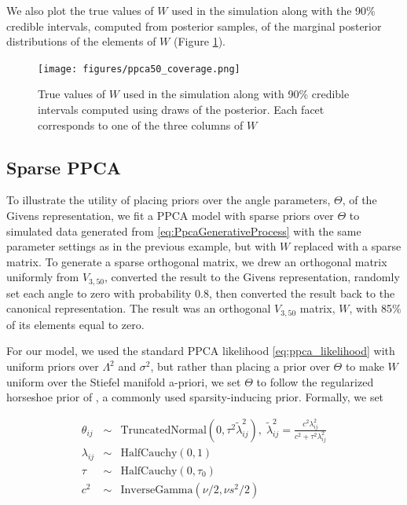 \documentclass[ba]{imsart}
\numberwithin{equation}{section}
\theoremstyle{plain}
\begin{document}
\noindent We also plot the true values of $W$ used in the simulation along with the 90\% credible intervals, computed from posterior samples, of the marginal posterior distributions of the elements of $W$ (Figure \ref{fig:ppca50_coverage}). 

\begin{figure}[h]
\centering
\vspace{.1in}
\texttt{[image: figures/ppca50\_coverage.png]}
\vspace{.05in}
\caption{True values of $W$ used in the simulation along with 90\% credible intervals computed using draws of the posterior. Each facet corresponds to one of the three columns of $W$}
\label{fig:ppca50_coverage}
\end{figure}


\subsection{Sparse PPCA}
To illustrate the utility of placing priors over the angle parameters, $\Theta$, of the Givens representation, we fit a PPCA model with sparse priors over $\Theta$ to simulated data generated from \ref{eq:PpcaGenerativeProcess} with the same parameter settings as in the previous example, but with $W$ replaced with a sparse matrix. To generate a sparse orthogonal matrix, we drew an orthogonal matrix uniformly from $V_{3,50}$, converted the result to the Givens representation, randomly set each angle to zero with probability 0.8, then converted the result back to the canonical representation. The result was an orthogonal $V_{3,50}$ matrix, $W$, with 85\% of its elements equal to zero.

\noindent For our model, we used the standard PPCA likelihood \ref{eq:ppca_likelihood} with uniform priors over $\Lambda^2$ and $\sigma^2$, but rather than placing a prior over $\Theta$ to make $W$ uniform over the Stiefel manifold a-priori, we set $\Theta$ to follow the regularized horseshoe prior of \cite{piironen2017sparsity}, a commonly used sparsity-inducing prior. Formally, we set

\begin{eqnarray}
\theta_{ij} &\sim& \mathrm{TruncatedNormal}(0, \tau^2 \tilde{\lambda}_{ij}^2),\; \tilde{\lambda}_{ij}^2 = \frac{c^2 \lambda_{ij}^2}{c^2 + \tau^2 \lambda_{ij}^2}\\
\lambda_{ij} &\sim& \mathrm{Half Cauchy}(0,1)\nonumber \\
\tau &\sim& \mathrm{Half Cauchy}(0,\tau_0)\nonumber \\
c^2 &\sim& \mathrm{Inverse Gamma}(\nu/2, \nu s^2/2)\nonumber
\end{eqnarray}
\end{document}
